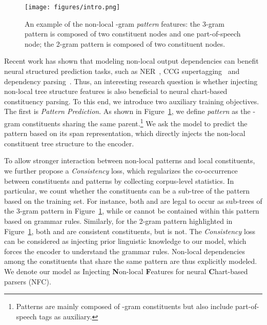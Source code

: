 \documentclass[11pt]{article}
\begin{document}
\begin{figure}
    \centering
    \texttt{[image: figures/intro.png]}
    \caption{An example of the non-local -gram {\it pattern} features: the 3-gram pattern  is composed of two constituent nodes and one part-of-speech node; the 2-gram pattern  is composed of two constituent nodes. }
    \label{fig:intro}
\end{figure}


Recent work has shown that modeling non-local output dependencies can benefit neural structured prediction tasks, such as NER~\cite{lstm-crf}, CCG supertagging~\cite{lan} and dependency parsing~\cite{zhang-etal-2020-efficient}. 
Thus, an interesting research question is whether injecting non-local tree structure features is also beneficial to neural chart-based constituency parsing. 
To this end, we introduce two auxiliary training objectives. 
The first is {\it Pattern Prediction}. 
As shown in Figure~\ref{fig:intro}, we define {\it pattern} as the -gram constituents sharing the same parent.\footnote{Patterns are mainly composed of -gram constituents but also include part-of-speech tags as auxiliary.} We ask the model to predict the pattern based on its span representation, which directly injects the non-local constituent tree structure to the encoder. 


To allow stronger interaction between non-local patterns and local constituents, 
we further propose a {\it Consistency} loss, which regularizes the co-occurrence between constituents and patterns by collecting corpus-level statistics. In particular, we count whether the constituents can be a sub-tree of the pattern based on the training set.
For instance, both  and  are legal to occur as sub-trees of the 3-gram pattern  in Figure~\ref{fig:intro}, while  or  cannot be contained within this pattern based on grammar rules.
Similarly, for the 2-gram pattern  highlighted in Figure~\ref{fig:intro}, both  and  are consistent constituents, but  is not.
The {\it Consistency} loss can be considered as injecting prior linguistic knowledge to our model, which forces the encoder to understand the grammar rules.  
Non-local dependencies among the constituents that share the same pattern are thus explicitly modeled. 
We denote our model as Injecting {\bf N}on-local {\bf F}eatures for neural {\bf C}hart-based parsers (NFC).
\end{document}
